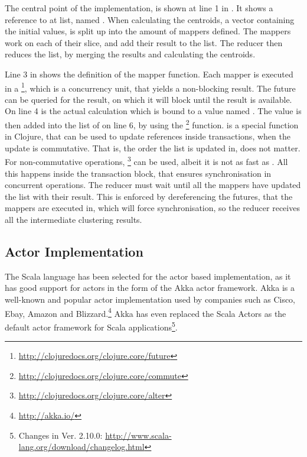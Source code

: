 {The central point of the implementation, is shown at line 1 in . It shows a reference to at list, named . When calculating the centroids, a vector containing the initial values, is split up into the amount of mappers defined. The mappers work on each of their slice, and add their result to the  list. The reducer then reduces the list, by merging the results and calculating the centroids.

Line 3 in  shows the definition of the mapper function. Each mapper is executed in a \footnote{\url{http://clojuredocs.org/clojure.core/future}}, which is a concurrency unit, that yields a non-blocking result. The future can be queried for the result, on which it will block until the result is available. On line 4 is the actual calculation which is bound to a value named . The  value is then added into the list of  on line 6, by using the \footnote{\url{http://clojuredocs.org/clojure.core/commute}} function.  is a special function in Clojure, that can be used to update references inside transactions, when the update is commutative. That is, the order the list is updated in, does not matter. For non-commutative operations, \footnote{\url{http://clojuredocs.org/clojure.core/alter}} can be used, albeit it is not as fast as . All this happens inside the  transaction block, that ensures synchronisation in concurrent operations. The reducer must wait until all the mappers have updated the list with their result. This is enforced by dereferencing the futures, that the mappers are executed in, which will force synchronisation, so the reducer receives all the intermediate clustering results.

\subsection{Actor Implementation}
The Scala language has been selected for the actor based implementation, as it has good support for actors in the form of the Akka actor framework. Akka is a well-known and popular actor implementation used by companies such as Cisco, Ebay, Amazon and Blizzard.\footnote{\url{http://akka.io/}} Akka has even replaced the Scala Actors as the default actor framework for Scala applications\footnote{Changes in Ver. 2.10.0: \url{http://www.scala-lang.org/download/changelog.html}}.

}
